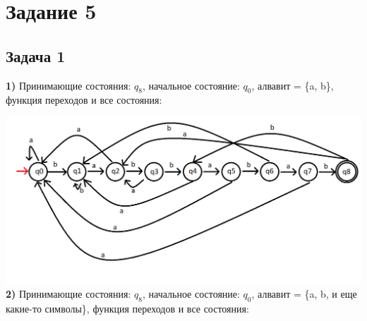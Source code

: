 \documentclass[a4paper,14pt]{article} %
\begin{document}

\section{Задание 5}
\subsection{Задача 1}

\textbf{1)} Принимающие состояния: $q_8$, начальное состояние: $q_0$, алвавит = \{a, b\}, функция переходов и все состояния:

    \includegraphics[scale=0.57]{01.png}
\newline\textbf{2)}  
Принимающие состояния: $q_8$, начальное состояние: $q_0$, алвавит = \{a, b, и еще какие-то символы\}, функция переходов и все состояния:
\end{document}
